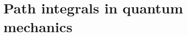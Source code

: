 \documentclass[twoside]{amsart}
\begin{document}







\section{Path integrals in quantum mechanics}
\end{document}
